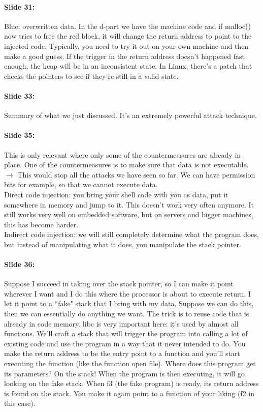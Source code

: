 \documentclass[10pt,a4paper]{report}
\begin{document}
\paragraph{Slide 31:} Blue: overwritten data. In the d-part we have the machine code and if malloc() now tries to free the red block, it will change the return address to point to the injected code. Typically, you need to try it out on your own machine and then make a good guess. If the trigger in the return address doesn't happened fast enough, the heap will be in an inconsistent state. In Linux, there's a patch that checks the pointers to see if they're still in a valid state.

\paragraph{Slide 33:} Summary of what we just discussed. It's an extremely powerful attack technique.

\paragraph{Slide 35:} This is only relevant where only some of the countermeasures are already in place. One of the countermeasures is to make sure that data is not executable. $\rightarrow$ This would stop all the attacks we have seen so far. We can have permission bits for example, so that we cannot execute data.\\
Direct code injection: you bring your shell code with you as data, put it somewhere in memory and jump to it. This doesn't work very often anymore. It still works very well on embedded software, but on servers and bigger machines, this has become harder.\\
Indirect code injection: we will still completely determine what the program does, but instead of manipulating what it does, you manipulate the stack pointer.

\paragraph{Slide 36:} Suppose I succeed in taking over the stack pointer, so I can make it point wherever I want and I do this where the processor is about to execute return.  I let it point to a ``fake" stack that I bring with my data. Suppose we can do this, then we can essentially do anything we want. The trick is to reuse code that is already in code memory. libc is very important here: it's used by almost all functions. We'll craft a stack that will trigger the program into calling a lot of existing code and use the program in a way that it never intended to do. You make the return address to be the entry point to a function and you'll start executing the function (like the function open file). Where does this program get its parameters? On the stack! When the program is then executing, it will go looking on the fake stack. When f3 (the fake program) is ready, its return address is found on the stack. You make it again point to a function of your liking (f2 in this case).
\end{document}
